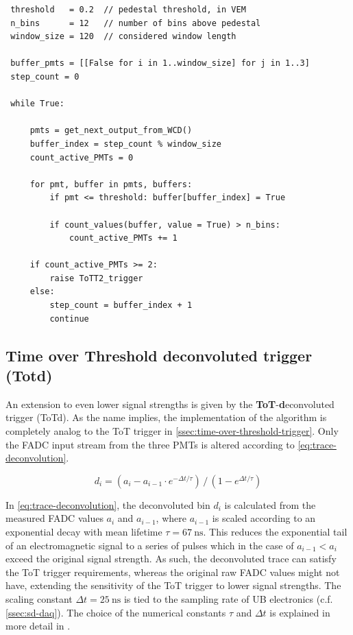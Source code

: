 \begin{lstlisting}
 threshold   = 0.2  // pedestal threshold, in VEM
 n_bins      = 12   // number of bins above pedestal
 window_size = 120  // considered window length

 buffer_pmts = [[False for i in 1..window_size] for j in 1..3] 
 step_count = 0

 while True:

     pmts = get_next_output_from_WCD()
     buffer_index = step_count % window_size
     count_active_PMTs = 0

     for pmt, buffer in pmts, buffers:
         if pmt <= threshold: buffer[buffer_index] = True

         if count_values(buffer, value = True) > n_bins:
             count_active_PMTs += 1

     if count_active_PMTs >= 2:
         raise ToTT2_trigger
     else:
         step_count = buffer_index + 1
         continue
\end{lstlisting}
    

\subsection{Time over Threshold deconvoluted trigger (Totd)}
\label{ssec:time-over-threshold-deconvoluted}

An extension to even lower signal strengths is given by the \textbf{ToT}-\textbf{d}econvoluted trigger (ToTd). As the name implies, the implementation of the 
algorithm is completely analog to the ToT trigger in \autoref{ssec:time-over-threshold-trigger}. Only the FADC input stream from the three PMTs is altered 
according to \autoref{eq:trace-deconvolution}.

\begin{equation}
    \label{eq:trace-deconvolution}
    d_i = (a_i - a_{i-1}\cdot e^{-\Delta t/\tau})\,/\,(1 - e^{\Delta t/\tau}) 
\end{equation}

In \autoref{eq:trace-deconvolution}, the deconvoluted bin $d_i$ is calculated from the measured FADC values $a_i$ and $a_{i-1}$, where $a_{i-1}$ is scaled 
according to an exponential decay with mean lifetime $\tau = \SI{67}{\nano\second}$. This reduces the exponential tail of an electromagnetic signal to a 
series of pulses which in the case of $a_{i-1} < a_i$ exceed the original signal strength. As such, the deconvoluted trace can satisfy the ToT trigger 
requirements, whereas the original raw FADC values might not have, extending the sensitivity of the ToT trigger to lower signal strengths. The scaling constant 
$\Delta t = \SI{25}{\nano\second}$ is tied to the sampling rate of UB electronics (c.f. \autoref{ssec:sd-daq}). The choice of the numerical constants $\tau$ and 
$\Delta t$ is explained in more detail in \cite{ToTtriggerIdea}.

